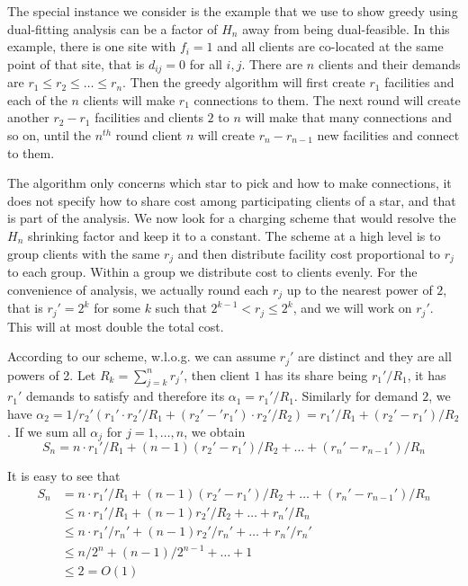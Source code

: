 \documentclass{article}[11pt]
\begin{document}
The special instance we consider is the example that we use to show
greedy using dual-fitting analysis can be a factor of $H_n$ away from
being dual-feasible. In this example, there is one site with $f_i=1$
and all clients are co-located at the same point of that site, that is
$d_{ij}=0$ for all $i,j$. There are $n$ clients and their demands are
$r_1 \leq r_2 \leq \ldots \leq r_n$. Then the greedy algorithm will
first create $r_1$ facilities and each of the $n$ clients will make
$r_1$ connections to them. The next round will create another $r_2 -
r_1$ facilities and clients $2$ to $n$ will make that many connections
and so on, until the $n^{th}$ round client $n$ will create $r_n -
r_{n-1}$ new facilities and connect to them.

The algorithm only concerns which star to pick and how to make
connections, it does not specify how to share cost among participating
clients of a star, and that is part of the analysis. We now look for a
charging scheme that would resolve the $H_n$ shrinking factor and keep
it to a constant. The scheme at a high level is to group clients with
the same $r_j$ and then distribute facility cost proportional to $r_j$
to each group. Within a group we distribute cost to clients
evenly. For the convenience of analysis, we actually round each $r_j$
up to the nearest power of $2$, that is $r_j'=2^k$ for some $k$ such
that $2^{k-1} < r_j \leq 2^k$, and we will work on $r_j'$. This will
at most double the total cost.

According to our scheme, w.l.o.g. we can assume $r_j'$ are distinct
and they are all powers of 2. Let $R_k = \sum_{j=k}^n r_j'$, then
client $1$ has its share being $r_1'/R_1$, it has $r_1'$ demands to
satisfy and therefore its $\alpha_1 = r_1'/R_1$. Similarly for demand
$2$, we have $\alpha_2 = 1/r_2' (r_1'\cdot r_2'/R_1 +
(r_2'-'r_1')\cdot r_2'/R_2) = r_1'/R_1 + (r_2'-r_1')/R_2$. If we sum
all $\alpha_j$ for $j=1,\ldots,n$, we obtain
\begin{equation}
S_n = n\cdot r_1'/R_1 + (n-1) (r_2'-r_1')/R_2 + \ldots + (r_n' -
r_{n-1}') / R_n
\end{equation}

It is easy to see that
\begin{align*}
S_n &= n\cdot r_1'/R_1 + (n-1) (r_2'-r_1')/R_2 + \ldots + (r_n' -
r_{n-1}') / R_n\\
&\leq n\cdot r_1'/R_1 + (n-1) r_2' / R_2 + \ldots + r_n' / R_n\\
&\leq n\cdot r_1'/r_n' + (n-1) r_2' / r_n' + \ldots + r_n' / r_n'\\
&\leq n/2^n + (n-1)/2^{n-1} + \ldots + 1\\
&\leq 2 = O(1)\\
\end{align*}
\end{document}
